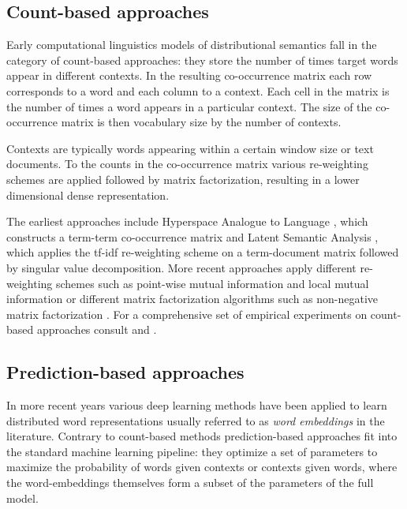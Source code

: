 \subsection{Count-based approaches}
\label{sec:count}

Early computational linguistics models of distributional semantics fall in the category of
count-based approaches: they store the number of times target words appear in different
contexts. In the resulting co-occurrence matrix
each row corresponds to a
word and each column to a context. Each cell in the matrix is the number of times a word 
appears in a particular context.
The size of the co-occurrence matrix is then vocabulary size by the number of contexts.

Contexts are typically words appearing within a certain window size or text documents.
To the counts in the co-occurrence matrix various re-weighting schemes are applied followed 
by matrix factorization, resulting in a lower dimensional dense representation.

The earliest approaches include Hyperspace Analogue to Language \citep{lund1996producing},
which constructs a term-term co-occurrence matrix and Latent Semantic Analysis \citep{dumais2004latent},
which applies the tf-idf re-weighting scheme on a term-document matrix
followed by singular value decomposition.
More recent approaches apply different re-weighting schemes such as
point-wise mutual information \citep{bullinaria2007extracting}  and local mutual
information \citep{evert2005statistics} or different matrix factorization algorithms such as non-negative
matrix factorization \citep{baroni2014don}. For a comprehensive set of empirical experiments on count-based
approaches consult \cite{bullinaria2007extracting} and \cite{bullinaria2012extracting}.

\subsection{Prediction-based approaches}
\label{sec:pred}
In more recent years
various deep learning methods have been applied to learn distributed word representations usually referred to
as \emph{word embeddings} in the literature.
Contrary to count-based methods prediction-based approaches fit into the
standard machine learning pipeline: they optimize a set of parameters to maximize the probability of words
given contexts or contexts given words, where the word-embeddings 
themselves form a subset of the parameters of the full model.

